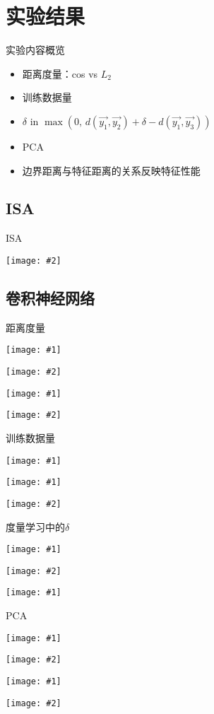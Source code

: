\documentclass {beamer}
\newcommand{\addgraph}[2]{\begin{center}
\texttt{[image: \#2]}\end{center}}
\newcommand{\addtwocolplot}[2]{\centering
    \begin{minipage}{0.49\textwidth}
        \centering
        \texttt{[image: \#1]}
    \end{minipage}
    \begin{minipage}{0.49\textwidth}
        \centering
        \texttt{[image: \#2]}
    \end{minipage}
}
\newcommand{\addplottcs}[1]{\begin{center}
    \texttt{[image: \#1]}
\end{center}}
\begin{document}
\section{实验结果}

\begin{frame}{实验内容概览}
    \begin{itemize}
        \item 距离度量：cos vs $L_2$
        \item 训练数据量
        \item $\delta$ in $\max\left(0,\,
            d(\vec{y_1}, \vec{y_2}) + \delta - d(\vec{y_1}, \vec{y_3})\right)$
        \item PCA
        \item 边界距离与特征距离的关系反映特征性能
    \end{itemize}
\end{frame}

\subsection{ISA}
\begin{frame}{ISA}
    \addgraph{0.65}{res/expr/isa.pdf}
\end{frame}

\subsection{卷积神经网络}
\begin{frame}{距离度量}
    \addtwocolplot{res/expr/clsfy/measure/0.pdf}{res/expr/clsfy/measure/1.pdf}
    \addtwocolplot{res/expr/mtrc/measure/0-0.pdf}{res/expr/mtrc/measure/1-0.pdf}
\end{frame}

\begin{frame}{训练数据量}
    \addplottcs{res/expr/clsfy/datasize.pdf}
    \addtwocolplot{res/expr/mtrc/datasize/0.pdf}{res/expr/mtrc/datasize/1.pdf}
\end{frame}

\begin{frame}{度量学习中的$\delta$}
    \addtwocolplot{res/expr/mtrc/delta/0.pdf}{res/expr/mtrc/delta/1.pdf}
    \addplottcs{res/expr/mtrc/delta/2.pdf}
\end{frame}

\begin{frame}{PCA}
    \addtwocolplot{res/expr/clsfy/pca/0.pdf}{res/expr/clsfy/pca/1.pdf}
    \addtwocolplot{res/expr/mtrc/pca/0.pdf}{res/expr/mtrc/pca/1.pdf}
\end{frame}
\end{document}
